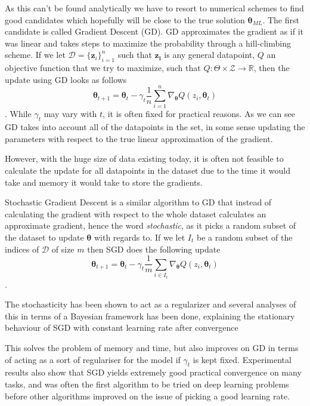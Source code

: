 As this can't be found analytically we have to resort to numerical schemes to
find good candidates which hopefully will be close to the true solution
$\bm{\theta}_{ML}$. The first candidate is called Gradient Descent (GD).
GD approximates the gradient as if it was linear and takes steps to maximize the
probability through a hill-climbing scheme. If we let $\mathcal{D} =
\{\bm{z}_i\}_{i = 1}^n$ such that $\bm{z_i}$ is any general datapoint, $Q$ an
objective function that we try to maximize, such that $Q : \Theta \times
\mathcal{Z} \to \mathbb{R}$, then the update using GD looks as follows
\begin{equation}
  \label{eq:GD_update}
  \bm{\theta}_{t + 1} = \bm{\theta}_t - \gamma_t \frac{1}{n} \sum_{i = 1}^n \nabla_{\bm{\theta}} Q(z_i, \bm{\theta}_t)
\end{equation}.
While $\gamma_t$ may vary with $t$, it is often fixed for practical reasons. As
we can see GD takes into account all of the datapoints in the set, in some sense
updating the parameters with respect to the true linear approximation of the gradient.

However, with the huge size of data existing today, it is often not feasible to
calculate the update for all datapoints in the dataset due to the time it would
take and memory it would take to store the gradients.

Stochastic Gradient Descent is a similar algorithm to GD that instead of
calculating the gradient with respect to the whole dataset calculates an
approximate gradient, hence the word \textit{stochastic}, as it picks a random
subset of the dataset to update $\bm{\theta}$ with regards to. If we let $I_t$
be a random subset of the indices of $\mathcal{D}$ of size $m$ then SGD does the
following update
\begin{equation}
  \label{eq:SGD_update}
  \bm{\theta}_{t + 1} = \bm{\theta}_t - \gamma_t \frac{1}{m} \sum_{i \in I_t} \nabla_{\bm{\theta}} Q(z_i, \bm{\theta}_t)
\end{equation}\cite{series/lncs/Bottou12}\cite[p.~240]{Bishop:2006}.

The stochasticity has been shown to act as a regularizer and several analyses of
this in terms of a Bayesian framework has been done, explaining the stationary
behaviour of SGD with constant learning rate after
convergence\cite{mandt_stochastic_2017, mandt_variational_2016}

This solves the problem of memory and time, but also improves on GD in terms of
acting as a sort of regulariser for the model if $\gamma_t$ is kept fixed.
Experimental results also show that SGD yields extremely good practical
convergence on many tasks, and was often the first algorithm to be tried on deep
learning problems before other algorithms improved on the issue of picking a
good learning rate.

